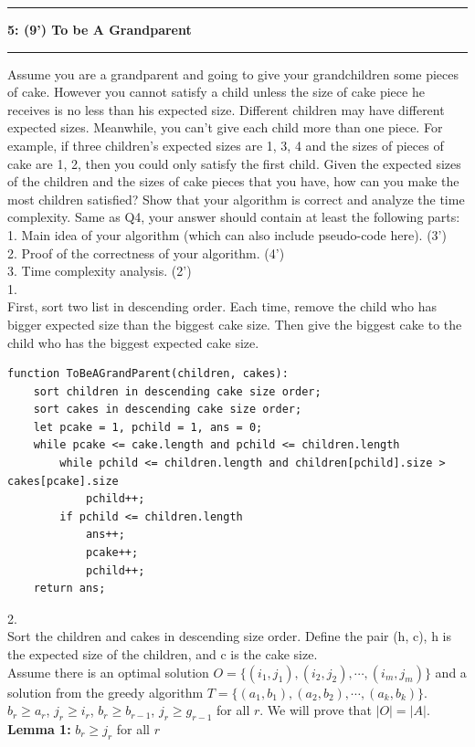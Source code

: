 \documentclass[10.5pt]{article}
\newcommand\question[2]{\vspace{.25in}\hrule\textbf{#1: #2}\vspace{.5em}\hrule\vspace{.10in}}
\begin{document}
\pagebreak

\question{5}{(9') To be A Grandparent}
Assume you are a grandparent and going to give your grandchildren some pieces of cake. However you cannot satisfy a child unless the size of cake piece he receives is no less than his expected size. Different children may have different expected sizes. Meanwhile, you can’t give each child more than one piece. For example, if three children’s expected sizes are {1, 3, 4} and the sizes of pieces of
cake are {1, 2}, then you could only satisfy the first child. Given the expected sizes of the children and the sizes of cake pieces that you have, how can you make the most children satisfied? Show that your algorithm is correct and analyze the time complexity. Same as Q4, your answer should contain at least the following parts: \\
1. Main idea of your algorithm (which can also include pseudo-code here). (3')\\
2. Proof of the correctness of your algorithm. (4')\\
3. Time complexity analysis. (2')\\
1.
\\
First, sort two list in descending order. Each time, remove the child who has bigger expected size than the biggest cake size. Then give the biggest cake to the child who has the biggest expected cake size.\\
\begin{lstlisting}
function ToBeAGrandParent(children, cakes):
	sort children in descending cake size order;
	sort cakes in descending cake size order;
	let pcake = 1, pchild = 1, ans = 0;
	while pcake <= cake.length and pchild <= children.length
		while pchild <= children.length and children[pchild].size > cakes[pcake].size
			pchild++;
		if pchild <= children.length
			ans++;
			pcake++;
			pchild++;
	return ans;
\end{lstlisting}
2.
\\
Sort the children and cakes in descending size order. Define the pair (h, c), h is the expected size of the children, and c is the cake size.
\\
Assume there is an optimal solution $O =\{(i_1, j_1), (i_2, j_2), \cdots, (i_m, j_m) \}$ and a solution from the greedy algorithm $T = \{(a_1, b_1), (a_2, b_2), \cdots, (a_k, b_k)\}$. $b_r \ge a_r$, $j_r \ge i_r$, $b_r \ge b_{r - 1}$, $j_r \ge g_{r-1}$ for all $r$. We will prove that $|O| = |A|$.\\
\textbf{Lemma 1:} $b_r \ge j_r$ for all $r$
\end{document}
